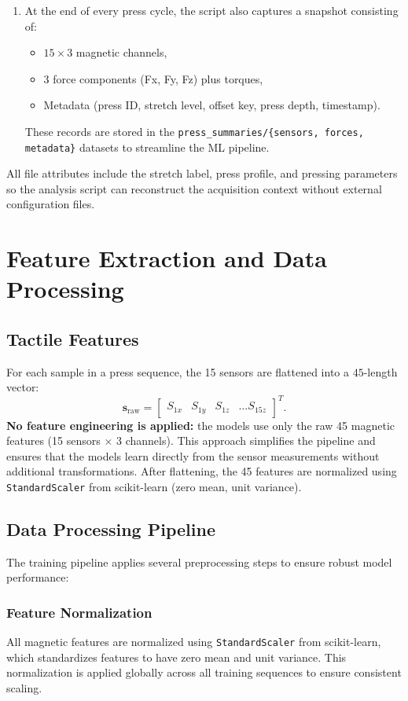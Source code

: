 \documentclass[11pt,a4paper]{article}
\begin{document}
\begin{enumerate}[leftmargin=1.5em]
    \item At the end of every press cycle, the script also captures a snapshot consisting of:
          \begin{itemize}
              \item \(15 \times 3\) magnetic channels,
              \item \(3\) force components (Fx, Fy, Fz) plus torques,
              \item Metadata (press ID, stretch level, offset key, press depth, timestamp).
          \end{itemize}
          These records are stored in the
          \texttt{press\_summaries/\{sensors, forces, metadata\}} datasets to streamline the ML
          pipeline.
\end{enumerate}
All file attributes include the stretch label, press profile, and pressing parameters so the
analysis script can reconstruct the acquisition context without external configuration files.

\section{Feature Extraction and Data Processing}

\subsection{Tactile Features}
For each sample in a press sequence, the 15 sensors are flattened into a \(45\)-length vector:
\[
    \mathbf{s}_{\text{raw}} = \left[\begin{array}{cccc}
        S_{1x} & S_{1y} & S_{1z} & \dotsc S_{15z}
    \end{array}\right]^T.
\]
\textbf{No feature engineering is applied:} the models use only the raw 45 magnetic features (15 sensors \(\times\) 3 channels). This approach simplifies the pipeline and ensures that the models learn directly from the sensor measurements without additional transformations. After flattening, the 45 features are normalized using \texttt{StandardScaler} from scikit-learn (zero mean, unit variance).


\subsection{Data Processing Pipeline}
The training pipeline applies several preprocessing steps to ensure robust model performance:

\subsubsection{Feature Normalization}
All magnetic features are normalized using \texttt{StandardScaler} from scikit-learn, which standardizes features to have zero mean and unit variance. This normalization is applied globally across all training sequences to ensure consistent scaling.
\end{document}
